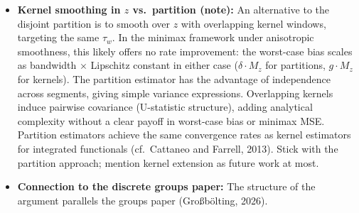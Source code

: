 \begin{itemize}
\begin{itemize}
		\item Lepski, Mammen, and Spokoiny (1997), ``Optimal Spatial Adaptation to Inhomogeneous Smoothness'' --- adaptive estimation under anisotropic smoothness. Check whether the coupling/agnosticism distinction appears.
		\item \textcite{yang_information-theoretic_1999}, ``Information-Theoretic Determination of Minimax Rates of Convergence'' --- defines anisotropic classes (\S6.6) and computes their metric entropy and minimax rates, but does not compare iso vs.\ aniso or discuss constraint set geometry. Confirmed: no coupling-agnosticism discussion.
		\item Birgé (2001), ``An Alternative Point of View on Lepski's Method'' --- check for discussion of smoothness class choice.
		\item Giné and Nickl (2016), \emph{Mathematical Foundations of Infinite-Dimensional Statistical Models} --- comprehensive modern treatment. Check chapters on Gaussian white noise model and smoothness classes.
		\item Wasserman (2006), \emph{All of Nonparametric Statistics} --- widely used textbook. Check treatment of isotropic assumptions.
	\end{itemize}
	The Imbens--Wager (2019) optimized RD and Armstrong--Kolesár (2020) bias-aware inference both use isotropic/pooled smoothness classes, under which covariate adjustment is provably pointless (\cref{sec:overview:negative}).
	\item \textbf{Kernel smoothing in $z$ vs.\ partition (note):} An alternative to the disjoint partition is to smooth over $z$ with overlapping kernel windows, targeting the same $\tau_w$.
	In the minimax framework under anisotropic smoothness, this likely offers no rate improvement: the worst-case bias scales as bandwidth $\times$ Lipschitz constant in either case ($\delta \cdot M_z$ for partitions, $g \cdot M_z$ for kernels).
	The partition estimator has the advantage of independence across segments, giving simple variance expressions.
	Overlapping kernels induce pairwise covariance (U-statistic structure), adding analytical complexity without a clear payoff in worst-case bias or minimax MSE.
	Partition estimators achieve the same convergence rates as kernel estimators for integrated functionals (cf.\ Cattaneo and Farrell, 2013).
	Stick with the partition approach; mention kernel extension as future work at most.
	\item \textbf{Connection to the discrete groups paper:} The structure of the argument parallels the groups paper (Gro\ss b\"olting, 2026).

\end{itemize}
